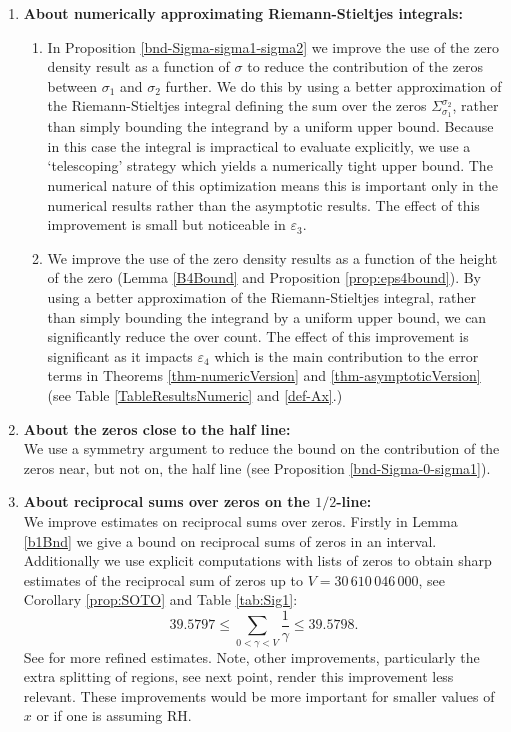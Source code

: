 \documentclass[10pt]{amsart}
\theoremstyle{definition}
\numberwithin{equation}{section}
\begin{document}
\begin{enumerate}
 \item {\bf About numerically approximating Riemann-Stieltjes integrals:}
\begin{enumerate}
\item In Proposition \ref{bnd-Sigma-sigma1-sigma2} we improve the use of the zero density result as a function of $\sigma$ to reduce the contribution of the zeros between $\sigma_1$ and $\sigma_2$ further. 
We do this by using a better approximation of the Riemann-Stieltjes integral defining the sum over the zeros $\Sigma_{\sigma_1}^{\sigma_2}$, rather than simply bounding the integrand by a uniform upper bound. 
Because in this case the integral is impractical to evaluate explicitly, we use a `telescoping' strategy which yields a numerically tight upper bound.
The numerical nature of this optimization means this is important only in the numerical results rather than the asymptotic results. The effect of this improvement is small but noticeable in $\varepsilon_3$.
 
 \item We improve the use of the zero density results as a function of the height of the zero  (Lemma \ref{B4Bound} and Proposition \ref{prop:eps4bound}). By using a better approximation of the Riemann-Stieltjes integral, rather than 
 simply bounding the integrand by a uniform upper bound, we can significantly reduce the over count. The effect of this improvement is significant as it impacts $\varepsilon_4$ which is the main contribution to the error terms in Theorems \ref{thm-numericVersion} and \ref{thm-asymptoticVersion} (see Table \ref{TableResultsNumeric} and \eqref{def-Ax}.)
\end{enumerate}

\item {\bf About the zeros close to the half line:}\\
We use a symmetry argument to reduce the bound on the contribution of the zeros near, but not on, the half line (see Proposition \ref{bnd-Sigma-0-sigma1}).
 


 \item {\bf About reciprocal sums over zeros on the $1/2$-line:}\\
 We improve estimates on reciprocal sums over zeros. Firstly in Lemma \ref{b1Bnd} we give a bound on reciprocal sums of zeros in an interval. 
Additionally we use explicit computations with lists of zeros to obtain sharp estimates of the reciprocal sum of zeros up to $V=30\,610\,046\,000$, see Corollary \ref{prop:SOTO} and Table \ref{tab:Sig1}: 
\[39.5797 \le \sum_{ 0 < \gamma < V  } \frac{1}{\gamma}\le 39.5798.\] 
See \cite{BrPlTr21} for more refined estimates.
Note, other improvements, particularly the extra splitting of regions, see next point, render this improvement less relevant.
These improvements would be more important for smaller values of $x$ or if one is assuming RH. 


\end{enumerate}
\end{document}
